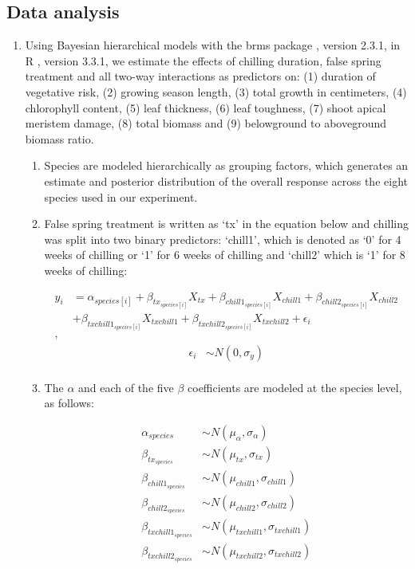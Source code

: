 \documentclass{article}\usepackage[]{graphicx}\usepackage[]{color}
\begin{document}
\subsection*{Data analysis}
\begin{enumerate}
\item Using Bayesian hierarchical models with the brms package \citep{brms}, version 2.3.1,  in R \citep{R}, version 3.3.1, we estimate the effects of chilling duration, false spring treatment and all two-way interactions as predictors on: (1) duration of vegetative risk, (2) growing season length, (3) total growth in centimeters, (4) chlorophyll content, (5) leaf thickness, (6) leaf toughness, (7) shoot apical meristem damage, (8) total biomass and (9) belowground to aboveground biomass ratio. 
  \begin{enumerate}
  \item Species are modeled hierarchically as grouping factors, which generates an estimate and posterior distribution of the overall response across the eight species used in our experiment.
  \item False spring treatment is written as `tx' in the equation below and chilling was split into two binary predictors: `chill1', which is denoted as `0' for 4 weeks of chilling or `1' for 6 weeks of chilling and `chill2' which is `1' for 8 weeks of chilling:

\begin{align*}
y_i &= \alpha_{species[i]} + \beta_{tx_{species[i]}}X_{tx} + \beta_{chill1_{species[i]}}X_{chill1} + \beta_{chill2_{species[i]}}X_{chill2}\\
&+ \beta_{txchill1_{species[i]}}X_{txchill1} + \beta_{txchill2_{species[i]}}X_{txchill2} + \epsilon_i \tag{1}\\,
\end{align*}
\begin{align*}
\epsilon_i & \sim N(0,\sigma_y) \\
\end{align*}

\item The $\alpha$ and each of the five $\beta$ coefficients are modeled at the species level, as follows:

\begin{align*}
\alpha_{species} & \sim N(\mu_{\alpha}, \sigma_{\alpha}) \\
\beta_{tx_{species}} & \sim N(\mu_{tx}, \sigma_{tx}) \\
\beta_{chill1_{species}} & \sim N(\mu_{chill1}, \sigma_{chill1}) \\
\beta_{chill2_{species}} & \sim N(\mu_{chill2}, \sigma_{chill2}) \\
\beta_{txchill1_{species}} & \sim N(\mu_{txchill1}, \sigma_{txchill1}) \\
\beta_{txchill2_{species}} & \sim N(\mu_{txchill2}, \sigma_{txchill2}) \\
\end{align*}


\end{enumerate}
\end{enumerate}
\end{document}
